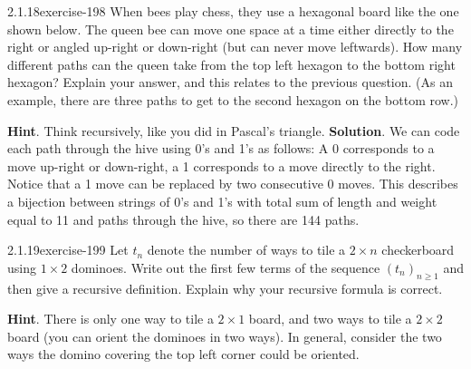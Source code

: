\documentclass[twoside,11pt,]{book}
\numberwithin{equation}{chapter}
\begin{document}
\begin{divisionsolution}{2.1.18}{}{exercise-198}%
\hypertarget{p-3060}{}%
When bees play chess, they use a hexagonal board like the one shown below. The queen bee can move one space at a time either directly to the right or angled up-right or down-right (but can never move leftwards). How many different paths can the queen take from the top left hexagon to the bottom right hexagon? Explain your answer, and this relates to the previous question. (As an example, there are three paths to get to the second hexagon on the bottom row.)%
\begin{sidebyside}{1}{0.15}{0.15}{0}%
\begin{sbspanel}{0.7}%
\end{sbspanel}%
\end{sidebyside}%
\par\smallskip%
\noindent\textbf{Hint}.\quad%
\hypertarget{p-3062}{}%
Think recursively, like you did in Pascal's triangle.%
\textbf{Solution}.\quad%
\hypertarget{p-3061}{}%
We can code each path through the hive using 0's and 1's as follows: A 0 corresponds to a move up-right or down-right, a 1 corresponds to a move directly to the right. Notice that a 1 move can be replaced by two consecutive 0 moves. This describes a bijection between strings of 0's and 1's with total sum of length and weight equal to 11 and paths through the hive, so there are 144 paths.%
\end{divisionsolution}%
\begin{divisionsolution}{2.1.19}{}{exercise-199}%
\hypertarget{p-3063}{}%
Let \(t_n\) denote the number of ways to tile a \(2\times n\) checkerboard using \(1\times 2\) dominoes.  Write out the first few terms of the sequence \((t_n)_{n \ge 1}\) and then give a recursive definition.  Explain why your recursive formula is correct.%
\par\smallskip%
\noindent\textbf{Hint}.\quad%
\hypertarget{p-3064}{}%
There is only one way to tile a \(2 \times 1\) board, and two ways to tile a \(2\times 2\) board (you can orient the dominoes in two ways).  In general, consider the two ways the domino covering the top left corner could be oriented.%
\end{divisionsolution}%
\end{document}
